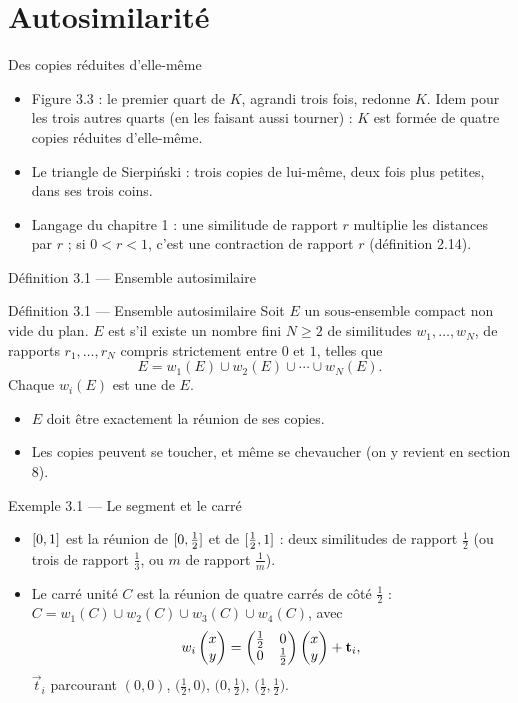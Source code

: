 \section{Autosimilarité}

\begin{frame}{Des copies réduites d'elle-même}
  \small
  \begin{itemize}
    \item Figure 3.3 : le premier quart de $K$, agrandi trois fois,
      redonne $K$. Idem pour les trois autres quarts (en les faisant aussi
      tourner) : $K$ est formée de quatre copies réduites d'elle-même.
    \item Le triangle de Sierpiński : trois copies de lui-même, deux fois
      plus petites, dans ses trois coins.
    \item Langage du chapitre 1 : une similitude de rapport $r$ multiplie
      les distances par $r$ ; si $0<r<1$, c'est une contraction de
      rapport $r$ (définition 2.14).
  \end{itemize}
\end{frame}

\begin{frame}{Définition 3.1 --- Ensemble autosimilaire}
  \begin{Enonce}{Définition 3.1 --- Ensemble autosimilaire}
    Soit $E$ un sous-ensemble compact non vide du plan. $E$ est
     s'il existe un nombre fini $N\geq2$ de
    similitudes $w_1,\dots,w_N$, de rapports $r_1,\dots,r_N$ compris
    strictement entre $0$ et $1$, telles que
    \[
      E = w_1(E)\cup w_2(E)\cup\cdots\cup w_N(E).
    \]
    Chaque $w_i(E)$ est une  de $E$.
  \end{Enonce}
  \small
  \begin{itemize}
    \item $E$ doit être exactement la réunion de ses copies.
    \item Les copies peuvent se toucher, et même se chevaucher (on y
      revient en section 8).
  \end{itemize}
\end{frame}

\begin{frame}{Exemple 3.1 --- Le segment et le carré}
  \small
  \begin{itemize}
    \item $\mathopen{[}{0},{1}\mathclose{]}$ est la réunion de $\mathopen{[}{0},{\tfrac12}\mathclose{]}$ et de
      $\mathopen{[}{\tfrac12},{1}\mathclose{]}$ : deux similitudes de rapport $\tfrac12$ (ou
      trois de rapport $\tfrac13$, ou $m$ de rapport $\tfrac1m$).
    \item Le carré unité $C$ est la réunion de quatre carrés de côté
      $\tfrac12$ : $C = w_1(C)\cup w_2(C)\cup w_3(C)\cup w_4(C)$, avec
      \[
        w_i\begin{pmatrix}x\\ y\end{pmatrix} = \begin{pmatrix}\tfrac12 & 0\\ 0 & \tfrac12\end{pmatrix}\begin{pmatrix}x\\ y\end{pmatrix} + \mathbf{t}_i,
      \]
      $\vec t_i$ parcourant $(0,0)$, $\big(\tfrac12,0\big)$,
      $\big(0,\tfrac12\big)$, $\big(\tfrac12,\tfrac12\big)$.
  \end{itemize}
\end{frame}

